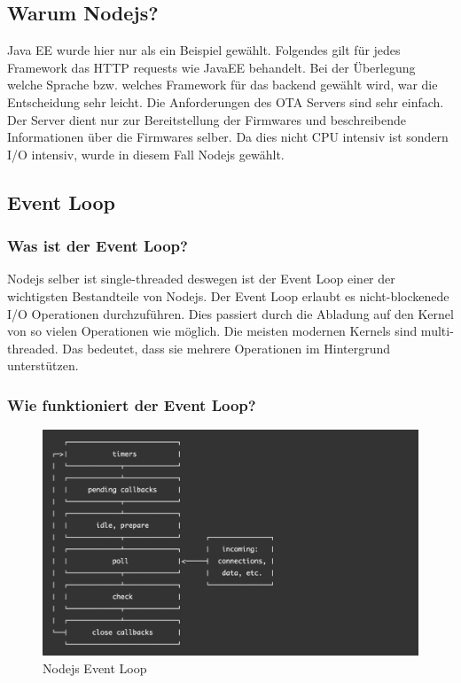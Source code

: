\subsection{Warum Nodejs?}

Java EE wurde hier nur als ein Beispiel gewählt. Folgendes gilt für jedes Framework das HTTP requests wie JavaEE behandelt. 
Bei der Überlegung welche Sprache bzw. welches Framework für das backend gewählt wird, war die Entscheidung sehr leicht.
Die Anforderungen des OTA Servers sind sehr einfach. Der Server dient nur zur Bereitstellung der Firmwares und beschreibende Informationen über die Firmwares selber.
Da dies nicht CPU intensiv ist sondern I/O intensiv, wurde in diesem Fall Nodejs gewählt.

\subsection{Event Loop}

\subsubsection{Was ist der Event Loop?}

Nodejs selber ist single-threaded deswegen ist der Event Loop einer der wichtigsten Bestandteile von Nodejs.
Der Event Loop erlaubt es nicht-blockenede I/O Operationen durchzuführen. Dies passiert durch die Abladung auf den Kernel von so vielen Operationen wie möglich.
\newline
\newline
Die meisten modernen Kernels sind multi-threaded. Das bedeutet, dass sie mehrere Operationen im Hintergrund unterstützen.

\subsubsection{Wie funktioniert der Event Loop?}

\begin{figure}[H]
    \begin{center}
        \includegraphics[scale=0.5]{images/nodejs_event_loop.png}
        \caption{Nodejs Event Loop \cite{nodejs_event_loop}}
    \end{center}
\end{figure}

